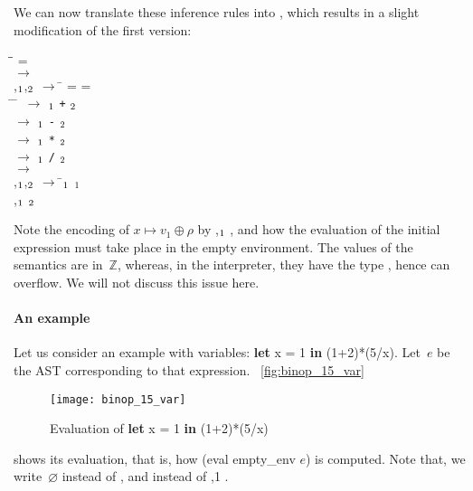 We can now translate these inference rules into \OCaml, which results
in a slight modification of the first version:
\begin{tabbing}
\Xlet \= \Xrec \=    = \Xmatch
  \Xwith\\
 \>   \(\rightarrow\) \\
 \vbar \> 
 \lpar{},\(\sb{1}\),\(\sb{2}\)\rpar{}
 \(\rightarrow\) \= \Xlet {} = 
 \Xand  {} = \\
 \> \> \Xin \= \lpar\Xmatch {} \Xwith \= \;\,  \(\rightarrow\)
 \(\sb{1}\) \texttt{+} \(\sb{2}\)\\
 \> \> \> \> \vbar  {} \(\rightarrow\)
 \(\sb{1}\) \texttt{-} \(\sb{2}\)\\
 \> \> \> \> \vbar {} \(\rightarrow\)
 \(\sb{1}\) \texttt{*} \(\sb{2}\)\\
 \> \> \> \> \vbar {} \(\rightarrow\)
 \(\sb{1}\) \texttt{/} \(\sb{2}\)\rpar\\

\vbar \>   \(\rightarrow\)  \\
\vbar \>  \lpar{},\(\sb{1}\),\(\sb{2}\)\rpar{}
\(\rightarrow\) \= \Xlet {}\(\sb{1}\) \equal {}
 \(\sb{1}\)\\
\>\>\Xin  {} \lpar{}
\lpar{},\(\sb{1}\)\rpar{} \rpar{}
\(\sb{2}\)
\end{tabbing}
Note the encoding of $x \mapsto v_1 \oplus \rho$ by 
\lpar{},\(\sb{1}\)\rpar{} , and how the
evaluation of the initial expression must take place in the empty
environment. The values of the semantics are in~$\mathbb{Z}$, whereas,
in the interpreter, they have the type , hence can
overflow. We will not discuss this issue here.

\paragraph{An example}

Let us consider an example with variables: \textsf{\textbf{let} x = 1
  \textbf{in} (1+2)*(5/x)}. Let~$e$ be the AST corresponding to that
expression. \Fig~\vref{fig:binop_15_var}
\begin{figure}[b]
\centering
\texttt{[image: binop\_15\_var]}
\caption{Evaluation of \textsf{\textbf{let} x = 1 \textbf{in} (1+2)*(5/x)}
\label{fig:binop_15_var}}
\end{figure}
shows its evaluation, that is, how \textsf{(eval empty\_env $e$)} is
computed. Note that, we write~$\varnothing$ instead of
, and  instead of \lpar{}
\lpar{},\num{1}\rpar{} \rpar.

